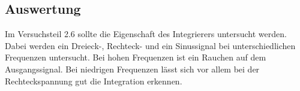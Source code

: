 \documentclass[12pt,a4paper]{article}
\begin{document}
\subsection{Auswertung}

Im Versuchsteil 2.6 sollte die Eigenschaft des Integrierers untersucht werden. Dabei werden ein Dreieck-, Rechteck- und ein Sinussignal bei unterschiedlichen Frequenzen untersucht. Bei hohen Frequenzen ist ein Rauchen auf dem Ausgangssignal.  Bei niedrigen Frequenzen lässt sich vor allem bei der Rechteckspannung gut die Integration erkennen.
\end{document}
